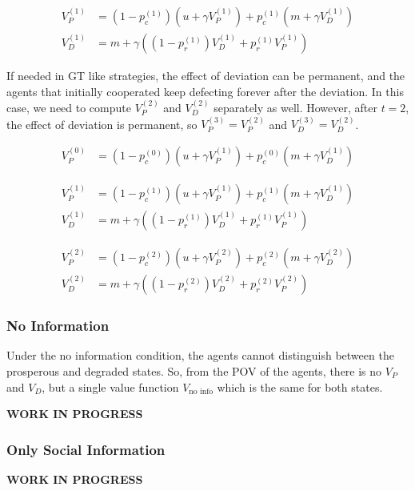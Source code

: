 \documentclass{article}
\begin{document}
\begin{equation}\label{V_P_from_t_1_onwards}
\begin{aligned}
    V_{P}^{(1)} &= \left(1 - p_{c}^{(1)}\right)\left( u + \gamma V_{P}^{(1)} \right) 
    + p_{c}^{(1)}\left( m + \gamma V_{D}^{(1)} \right)\\
    V_{D}^{(1)} &=  m + \gamma \left( (1 - p_{r}^{(1)}) V_{D}^{(1)} + p_{r}^{(1)} V_{P}^{(1)} \right)
\end{aligned}
\end{equation}



If needed in GT like strategies, the effect of deviation can be permanent, and the agents that initially cooperated keep defecting forever after the deviation. In this case,
we need to compute $V_P^{(2)}$ and $V_D^{(2)}$ separately as well. However, after $t=2$, the effect of deviation is permanent, so $V_P^{(3)} = V_P^{(2)}$ and $V_D^{(3)} = V_D^{(2)}$.


\begin{equation}
\begin{aligned}
    V_{P}^{(0)} &= \left(1 - p_{c}^{(0)}\right)\left( u + \gamma V_{P}^{(1)} \right) 
    + p_{c}^{(0)}\left( m + \gamma V_{D}^{(1)} \right)
\end{aligned}
\end{equation}

\begin{equation}
\begin{aligned}
    V_{P}^{(1)} &= \left(1 - p_{c}^{(1)}\right)\left( u + \gamma V_{P}^{(1)} \right) 
    + p_{c}^{(1)}\left( m + \gamma V_{D}^{(1)} \right)\\
    V_{D}^{(1)} &=  m + \gamma \left( (1 - p_{r}^{(1)}) V_{D}^{(1)} + p_{r}^{(1)} V_{P}^{(1)} \right)
\end{aligned}
\end{equation}

\begin{equation}
\begin{aligned}
    V_{P}^{(2)} &= \left(1 - p_{c}^{(2)}\right)\left( u + \gamma V_{P}^{(2)} \right) 
    + p_{c}^{(2)}\left( m + \gamma V_{D}^{(2)} \right)\\
    V_{D}^{(2)} &=  m + \gamma \left( (1 - p_{r}^{(2)}) V_{D}^{(2)} + p_{r}^{(2)} V_{P}^{(2)} \right)
\end{aligned}
\end{equation}


\subsubsection{No Information}

Under the no information condition, the agents cannot distinguish between the prosperous and degraded states. 
So, from the POV of the agents, there is no $V_P$ and $V_D$, but a single value function $V_{\text{no info}}$ which is the same for both states.

\textbf{WORK IN PROGRESS}

\subsubsection{Only Social Information}

\textbf{WORK IN PROGRESS}
\end{document}
